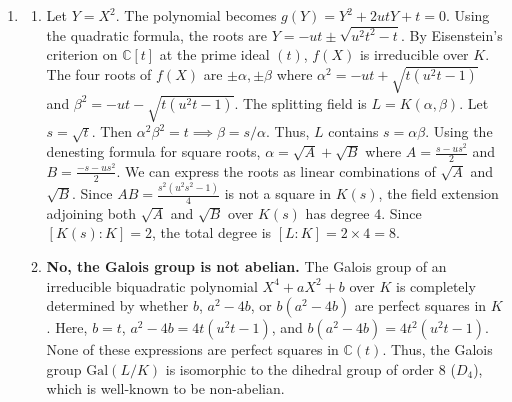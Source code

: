 \documentclass[10pt,a4paper]{article}
\begin{document}
\begin{enumerate}[label=\fbox{\arabic*}]
\begin{itemize}
            If $\lambda = 1$ or $\lambda = -1$, the centralizer of the non-diagonalizable matrices (with Jordan blocks) differs, but we can test them directly. A non-diagonalizable matrix with repeated eigenvalue $\pm 1$ is similar to $J = \pm \begin{pmatrix} 1 & 1 \\ 0 & 1 \end{pmatrix}$. Since $p \ge 3$, $p-1$ is even, so $J^{p-1} = \begin{pmatrix} 1 & p-1 \\ 0 & 1 \end{pmatrix} \neq \mathbb{I}$ (as $p-1 \not\equiv 0 \pmod p$). Thus, no non-diagonalizable matrices satisfy $A^{p-1} = \mathbb{I}$. 
            The only remaining matrices are the purely scalar ones, $A = \mathbb{I}$ and $A = -\mathbb{I}$, both of which trivially satisfy the equation (since $p-1$ is even). This gives $2$ matrices.
        \end{itemize}
        Summing these up, the total number of elements satisfying $A^{p-1} = \mathbb{I}$ is:
        \[
          2 + \frac{p(p+1)(p-3)}{2} = \frac{p^3 - 2p^2 - 3p + 4}{2}.
        \]

  \item %
        \begin{enumerate}[label=(\arabic*)]
          \item Let $Y = X^2$. The polynomial becomes $g(Y) = Y^2 + 2utY + t = 0$. Using the quadratic formula, the roots are $Y = -ut \pm \sqrt{u^2t^2 - t}$. By Eisenstein's criterion on $\mathbb{C}[t]$ at the prime ideal $(t)$, $f(X)$ is irreducible over $K$. 
          The four roots of $f(X)$ are $\pm \alpha, \pm \beta$ where $\alpha^2 = -ut + \sqrt{t(u^2t-1)}$ and $\beta^2 = -ut - \sqrt{t(u^2t-1)}$. The splitting field is $L = K(\alpha, \beta)$. Let $s = \sqrt{t}$. Then $\alpha^2 \beta^2 = t \implies \beta = s/\alpha$. Thus, $L$ contains $s = \alpha\beta$. 
          Using the denesting formula for square roots, $\alpha = \sqrt{A} + \sqrt{B}$ where $A = \frac{s - us^2}{2}$ and $B = \frac{-s - us^2}{2}$. We can express the roots as linear combinations of $\sqrt{A}$ and $\sqrt{B}$. Since $AB = \frac{s^2(u^2s^2 - 1)}{4}$ is not a square in $K(s)$, the field extension adjoining both $\sqrt{A}$ and $\sqrt{B}$ over $K(s)$ has degree $4$. Since $[K(s) : K] = 2$, the total degree is $[L : K] = 2 \times 4 = 8$.

          \item \textbf{No, the Galois group is not abelian.} 
          The Galois group of an irreducible biquadratic polynomial $X^4 + aX^2 + b$ over $K$ is completely determined by whether $b$, $a^2-4b$, or $b(a^2-4b)$ are perfect squares in $K$. Here, $b = t$, $a^2-4b = 4t(u^2t-1)$, and $b(a^2-4b) = 4t^2(u^2t-1)$. None of these expressions are perfect squares in $\mathbb{C}(t)$. Thus, the Galois group $\mathrm{Gal}(L/K)$ is isomorphic to the dihedral group of order $8$ ($D_4$), which is well-known to be non-abelian.
        \end{enumerate}


\end{enumerate}
\end{document}
